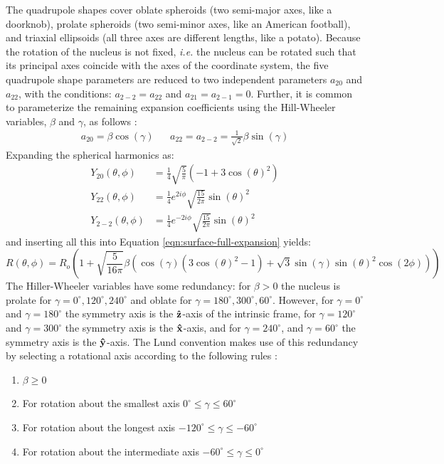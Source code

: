 The quadrupole shapes cover oblate spheroids (two semi-major axes, like a doorknob), prolate spheroids (two semi-minor axes, like an American football), and triaxial ellipsoids (all three axes are different lengths, like a potato). Because the rotation of the nucleus is not fixed, \emph{i.e.} the nucleus can be rotated such that its principal axes coincide with the axes of the coordinate system, the five quadrupole shape parameters are reduced to two independent parameters $a_{2 0}$ and $a_{2 2}$, with the conditions: $a_{2 -2}=a_{2 2}$ and $a_{2 1}=a_{2 -1}=0$. Further, it is common to parameterize the remaining expansion coefficients using the Hill-Wheeler variables, $\beta$ and $\gamma$, as follows \cite{wongBook}:
\begin{align}
\label{eqn:chp2-hill-wheeler}
a_{2 0} = \beta \cos(\gamma)  & &  a_{2 2} = a_{2 -2} = \frac{1}{\sqrt{2}}\beta \sin(\gamma)
\end{align}
Expanding the spherical harmonics as:
\begin{align}
\label{eqn:spherical-harmonics}
Y_{2 0}(\theta, \phi) &= \frac{1}{4} \sqrt{\frac{5}{\pi }} \left(-1+3 \cos(\theta )^2\right)\\
Y_{2 2}(\theta, \phi) &= \frac{1}{4} e^{2 i \phi } \sqrt{\frac{15}{2 \pi }} \sin(\theta)^2\\
Y_{2 -2}(\theta, \phi) &= \frac{1}{4} e^{-2 i \phi } \sqrt{\frac{15}{2 \pi }} \sin(\theta)^2
\end{align} 
and inserting all this into Equation \ref{eqn:surface-full-expansion} yields:
\begin{equation}
\label{eqn:quadrupole-surface}
R(\theta, \phi) = R_{o}\left(1+\sqrt{\frac{5}{16 \pi }}\beta  \left(\cos(\gamma ) \left(3 \cos(\theta )^2-1\right)+\sqrt{3} \sin(\gamma ) \sin(\theta )^2\cos(2 \phi )\right)\right)
\end{equation} 
The Hiller-Wheeler variables have some redundancy: for $\beta>0$ the nucleus is prolate for $\gamma=0^{\circ},120^{\circ},240^{\circ}$ and oblate for $\gamma=180^{\circ},300^{\circ},60^{\circ}$. However, for $\gamma=0^{\circ}$ and $\gamma=180^{\circ}$ the symmetry axis is the $\boldsymbol{\hat{\textbf{z}}}$-axis of the intrinsic frame, for $\gamma=120^{\circ}$ and $\gamma=300^{\circ}$ the symmetry axis is the $\boldsymbol{\hat{\textbf{x}}}$-axis, and for $\gamma=240^{\circ}$, and $\gamma=60^{\circ}$ the symmetry axis is the $\boldsymbol{\hat{\textbf{y}}}$-axis. The Lund convention makes use of this redundancy by selecting a rotational axis according to the following rules \cite{wongBook}:
\begin{enumerate}
\item $\beta\geq0$
\item For rotation about the smallest axis $0^{\circ}\leq\gamma\leq60^{\circ}$
\item For rotation about the longest axis $-120^{\circ}\leq\gamma\leq-60^{\circ}$
\item For rotation about the intermediate axis $-60^{\circ}\leq\gamma\leq0^{\circ}$
\end{enumerate}
